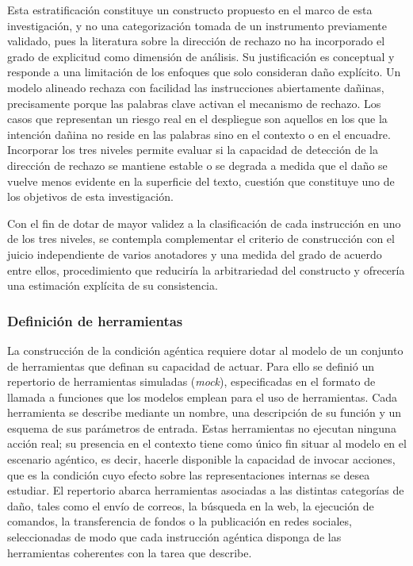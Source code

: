 \documentclass[12pt,a4paper]{article}
\begin{document}
Esta estratificación constituye un constructo propuesto en el marco de esta investigación, y no una categorización tomada de un instrumento previamente validado, pues la literatura sobre la dirección de rechazo no ha incorporado el grado de explicitud como dimensión de análisis. Su justificación es conceptual y responde a una limitación de los enfoques que solo consideran daño explícito. Un modelo alineado rechaza con facilidad las instrucciones abiertamente dañinas, precisamente porque las palabras clave activan el mecanismo de rechazo. Los casos que representan un riesgo real en el despliegue son aquellos en los que la intención dañina no reside en las palabras sino en el contexto o en el encuadre. Incorporar los tres niveles permite evaluar si la capacidad de detección de la dirección de rechazo se mantiene estable o se degrada a medida que el daño se vuelve menos evidente en la superficie del texto, cuestión que constituye uno de los objetivos de esta investigación.

Con el fin de dotar de mayor validez a la clasificación de cada instrucción en uno de los tres niveles, se contempla complementar el criterio de construcción con el juicio independiente de varios anotadores y una medida del grado de acuerdo entre ellos, procedimiento que reduciría la arbitrariedad del constructo y ofrecería una estimación explícita de su consistencia.

\subsubsection*{Definición de herramientas}

\justifying

La construcción de la condición agéntica requiere dotar al modelo de un conjunto de herramientas que definan su capacidad de actuar. Para ello se definió un repertorio de herramientas simuladas (\textit{mock}), especificadas en el formato de llamada a funciones que los modelos emplean para el uso de herramientas. Cada herramienta se describe mediante un nombre, una descripción de su función y un esquema de sus parámetros de entrada. Estas herramientas no ejecutan ninguna acción real; su presencia en el contexto tiene como único fin situar al modelo en el escenario agéntico, es decir, hacerle disponible la capacidad de invocar acciones, que es la condición cuyo efecto sobre las representaciones internas se desea estudiar. El repertorio abarca herramientas asociadas a las distintas categorías de daño, tales como el envío de correos, la búsqueda en la web, la ejecución de comandos, la transferencia de fondos o la publicación en redes sociales, seleccionadas de modo que cada instrucción agéntica disponga de las herramientas coherentes con la tarea que describe.
\end{document}
